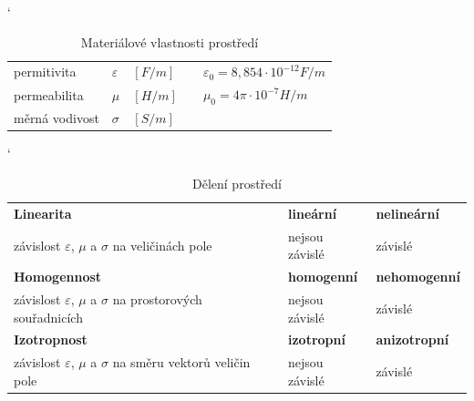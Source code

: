 \begin{table}[!h]
\catcode` 
\begin{center}
  	\caption{Materiálové vlastnosti prostředí}
  	\label{tab:evlny_parametry_prostredi}
\begin{tabular}{|lllp{1.5cm}l|}
	\hline
	permitivita		& $\varepsilon$	& $\unit{[F/m]}$ & 	& $\varepsilon_{0} = 8,854\cdot10^{-12}\unit{F/m} $\\
	
	permeabilita		& $\mu$		& $\unit{[H/m]}$ & 	& $\mu_{0} = 4\pi\cdot10^{-7}\unit{H/m}$\\
	
	měrná vodivost	& $\sigma$		& $\unit{[S/m]}$ & 	&\\
	\hline
\end{tabular}
\end{center}
\end{table}
\begin{table}[!h]
\catcode` 
\begin{center}
  	\caption{Dělení prostředí}
  	\label{tab:evlny_vlastnosti_prostredi}
\begin{tabular}{|lp{0.3cm}|l|l|}
	\hline
	{\bf Linearita}									& & {\bf lineární}	& {\bf nelineární}	\\
	závislost $\varepsilon$, $\mu$ a $\sigma$ na veličinách pole 		& & nejsou závislé 	& závislé		\\ 
	\hline
	{\bf Homogennost}								& & {\bf homogenní}	& {\bf nehomogenní}	\\
	závislost $\varepsilon$, $\mu$ a $\sigma$ na prostorových souřadnicích 	& & nejsou závislé 	& závislé		\\
	\hline
	{\bf Izotropnost}								& & {\bf izotropní}	& {\bf anizotropní}	\\
	závislost $\varepsilon$, $\mu$ a $\sigma$ na směru vektorů veličin pole 	& & nejsou závislé 	& závislé		\\
	\hline
\end{tabular}
\end{center}
\end{table}

